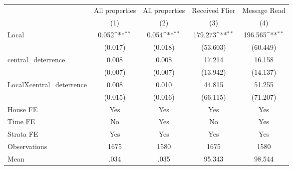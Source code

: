 {
\def\sym#1{\ifmmode^{#1}\else\(^{#1}\)\fi}
\begin{tabular}{l*{4}{c}}
\hline\hline
                &\multicolumn{1}{c}{All properties}&\multicolumn{1}{c}{All properties}&\multicolumn{1}{c}{Received Flier}&\multicolumn{1}{c}{Message Read}\\
                &\multicolumn{1}{c}{(1)}         &\multicolumn{1}{c}{(2)}         &\multicolumn{1}{c}{(3)}         &\multicolumn{1}{c}{(4)}         \\
\hline
Local           &    0.052\sym{**} &    0.054\sym{**} &  179.273\sym{**} &  196.565\sym{**} \\
                &  (0.017)         &  (0.018)         & (53.603)         & (60.449)         \\
central\_deterrence&    0.008         &    0.008         &   17.214         &   16.158         \\
                &  (0.007)         &  (0.007)         & (13.942)         & (14.137)         \\
LocalXcentral\_deterrence&    0.008         &    0.010         &   44.815         &   51.255         \\
                &  (0.015)         &  (0.016)         & (66.115)         & (71.207)         \\
House FE        &      Yes         &      Yes         &      Yes         &      Yes         \\
Time FE         &       No         &      Yes         &       No         &      Yes         \\
Strata FE       &      Yes         &      Yes         &      Yes         &      Yes         \\
\hline
Observations    &     1675         &     1580         &     1675         &     1580         \\
Mean            &     .034         &     .035         &   95.343         &   98.544         \\
\hline\hline
\end{tabular}
}
